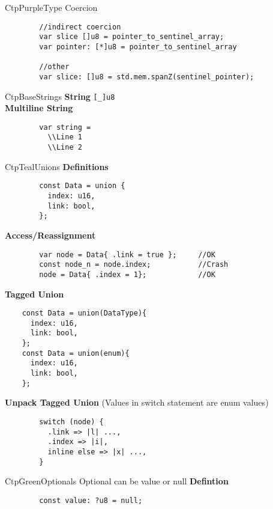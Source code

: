 \documentclass[10pt,a4paper]{article}
\begin{document}
\begin{multicols*}{3}
\begin{mycolorbox}{CtpPurple}{Type Coercion}
\begin{verbatim}
		//indirect coercion
		var slice []u8 = pointer_to_sentinel_array;
		var pointer: [*]u8 = pointer_to_sentinel_array
		
		//other
		var slice: []u8 = std.mem.spanZ(sentinel_pointer);
	\end{verbatim}
\end{mycolorbox}

\begin{mycolorbox}{CtpBase}{Strings}
	\textbf{String} \texttt{[_]u8}\\
	\textbf{Multiline String} \begin{verbatim}
		var string = 
		  \\Line 1
		  \\Line 2
	\end{verbatim}
\end{mycolorbox}



\begin{mycolorbox}{CtpTeal}{Unions}
	\textbf{Definitions}
	\begin{verbatim}
		const Data = union {
		  index: u16,
		  link: bool,
		};
	\end{verbatim}

	\textbf{Access/Reassignment}
	\begin{verbatim}
		var node = Data{ .link = true };     //OK
		const node_n = node.index;           //Crash
		node = Data{ .index = 1};            //OK
	\end{verbatim}

		\textbf{Tagged Union}
	\begin{verbatim}
	const Data = union(DataType){
	  index: u16,
	  link: bool,
	};
	const Data = union(enum){
	  index: u16,
	  link: bool,
	};
	\end{verbatim}

		\textbf{Unpack Tagged Union} (Values in switch statement are enum values)
	\begin{verbatim}
		switch (node) {
		  .link => |l| ...,
		  .index => |i|,
		  inline else => |x| ...,
		}
	\end{verbatim}
\end{mycolorbox}


\begin{mycolorbox}{CtpGreen}{Optionals}
	Optional can be value or null
	\textbf{Defintion}
	\begin{verbatim}
		const value: ?u8 = null;
	\end{verbatim}


\end{mycolorbox}
\end{multicols*}
\end{document}

